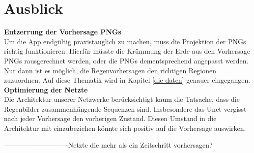 \section{Ausblick}
\textbf{Entzerrung der Vorhersage PNGs} \\
Um die App endgültig praxistauglich zu machen, muss die Projektion der PNGs richtig funktionieren. 
Hierfür müsste die Krümmung der Erde aus den Vorhersage PNGs rausgerechnet werden, oder die PNGs dementsprechend angepasst werden. 
Nur dann ist es möglich, die Regenvorhersagen den richtigen Regionen zuzuordnen. 
Auf diese Thematik wird in Kapitel \ref*{die daten} genauer eingegangen. \\

\noindent \textbf{Optimierung der Netzte} \\
Die Architektur unserer Netzwerke berücksichtigt kaum die Tatsache, dass die Regenbilder zusammenhängende Sequenzen sind.
Insbesondere das Unet vergisst nach jeder Vorhersage den vorherigen Zustand. Diesen Umstand in die Architektur mit einzubeziehen könnte sich positiv auf die Vorhersage auswirken.

----------------------------Netzte die mehr als ein Zeitschritt vorhersagen?\\
